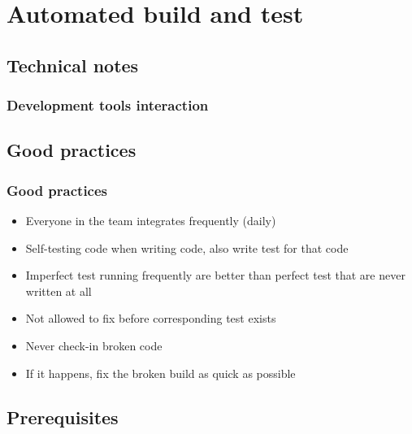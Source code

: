 \documentclass{beamer}
\begin{document}
\section[Automated build and test]{Automated build and test}
\subsection[Technical notes]{Technical notes}

\begin{frame}
\frametitle{Development tools interaction}
\centering
{}
\end{frame}

\subsection[Good practices]{Good practices}
\begin{frame}
\frametitle{Good practices}
\begin{itemize}
  \item<1-> Everyone in the team integrates frequently (daily)\cite{Fowler06}
  \item<2-> Self-testing code when writing code, also write test for
  that code\cite{Duvall07}
  \item<3-> Imperfect test running frequently are better than perfect test that
  are never written at all\cite{Duvall07}
  \item<4-> Not allowed to fix before corresponding test exists
  \item<5-> Never check-in broken code\cite{Berczuk03} 
  \item<6-> If it happens, fix the broken build as quick as possible 
\end{itemize}
\end{frame}


\subsection[Prerequisites]{Prerequisites}
\end{document}
